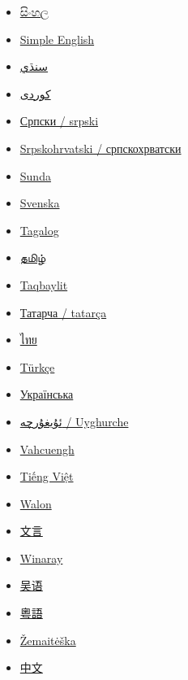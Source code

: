\documentclass[11pt,a4paper]{article}
\begin{document}
\begin{itemize}
\item \href{https://si.wikipedia.org/wiki/\%E0\%B6\%AD\%E0\%B7\%8F\%E0\%B6\%BB\%E0\%B7\%8F\%E0\%B7\%80\%E0\%B7\%8F}{සිංහල}
\item \href{https://simple.wikipedia.org/wiki/Duck}{Simple English}
\item \href{https://sd.wikipedia.org/wiki/\%D8\%A8\%D8\%AF\%DA\%AA}{سنڌي}
\item \href{https://ckb.wikipedia.org/wiki/\%D9\%85\%D8\%B1\%D8\%A7\%D9\%88\%DB\%8C}{کوردی}
\item \href{https://sr.wikipedia.org/wiki/\%D0\%9F\%D0\%B0\%D1\%82\%D0\%BA\%D0\%B0}{Српски / srpski}
\item \href{https://sh.wikipedia.org/wiki/Patka}{Srpskohrvatski / српскохрватски}
\item \href{https://su.wikipedia.org/wiki/Meri}{Sunda}
\item \href{https://sv.wikipedia.org/wiki/Egentliga\_andf\%C3\%A5glar}{Svenska}
\item \href{https://tl.wikipedia.org/wiki/Bibi}{Tagalog}
\item \href{https://ta.wikipedia.org/wiki/\%E0\%AE\%B5\%E0\%AE\%BE\%E0\%AE\%A4\%E0\%AF\%8D\%E0\%AE\%A4\%E0\%AF\%81}{தமிழ்}
\item \href{https://kab.wikipedia.org/wiki/Ab\%E1\%B9\%9Bik}{Taqbaylit}
\item \href{https://tt.wikipedia.org/wiki/\%D2\%AE\%D1\%80\%D0\%B4\%D3\%99\%D0\%BA\%D0\%BB\%D3\%99\%D1\%80}{Татарча / tatarça}
\item \href{https://th.wikipedia.org/wiki/\%E0\%B9\%80\%E0\%B8\%9B\%E0\%B9\%87\%E0\%B8\%94}{ไทย}
\item \href{https://tr.wikipedia.org/wiki/\%C3\%96rdek}{Türkçe}
\item \href{https://uk.wikipedia.org/wiki/\%D0\%9A\%D0\%B0\%D1\%87\%D0\%BA\%D0\%B8}{Українська}
\item \href{https://ug.wikipedia.org/wiki/\%D8\%A6\%DB\%86\%D8\%B1\%D8\%AF\%DB\%95\%D9\%83}{ئۇيغۇرچە / Uyghurche}
\item \href{https://za.wikipedia.org/wiki/Bit\_\%28doenghduz\%29}{Vahcuengh}
\item \href{https://vi.wikipedia.org/wiki/V\%E1\%BB\%8Bt}{Tiếng Việt}
\item \href{https://wa.wikipedia.org/wiki/Can\%C3\%A5rd}{Walon}
\item \href{https://zh-classical.wikipedia.org/wiki/\%E9\%B4\%A8}{文言}
\item \href{https://war.wikipedia.org/wiki/Pato}{Winaray}
\item \href{https://wuu.wikipedia.org/wiki/\%E9\%B8\%AD}{吴语}
\item \href{https://zh-yue.wikipedia.org/wiki/\%E9\%B4\%A8}{粵語}
\item \href{https://bat-smg.wikipedia.org/wiki/P\%C4\%ABl\%C4\%97}{Žemaitėška}
\item \href{https://zh.wikipedia.org/wiki/\%E9\%B8\%AD}{中文}
\end{itemize}
\end{document}
